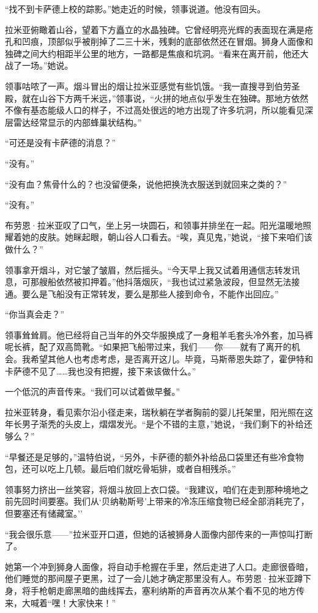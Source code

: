 \documentclass[AutoFakeBold=true]{book}
\begin{document}
``找不到卡萨德上校的踪影。''她走近的时候，领事说道。他没有回头。

拉米亚俯瞰着山谷，望着下方矗立的水晶独碑。它曾经明亮光辉的表面现在满是疮孔和凹痕，顶部似乎被削掉了二三十米，残剩的底部依然还在冒烟。狮身人面像和独碑之间大约相距半公里的地方，一路都是焦痕和坑洞。``看来在离开前，他还大战了一场。''她说。

领事咕哝了一声。烟斗冒出的烟让拉米亚感觉有些饥饿。``我一直搜寻到伯劳圣殿，就在山谷下方两千米远，''领事说，``火拼的地点似乎发生在独碑。那地方依然不像有基态能级人口的样子，不过高处很远的地方出现了许多坑洞，所以能看见深层雷达经常显示的内部蜂巢状结构。''

``可还是没有卡萨德的消息？''

``没有。''

``没有血？焦骨什么的？也没留便条，说他把换洗衣服送到就回来之类的？''

``没有。''

布劳恩·拉米亚叹了口气，坐上另一块圆石，和领事并排坐在一起。阳光温暖地照耀着她的皮肤。她眯起眼，朝山谷人口看去。``唉，真见鬼，''她说，``接下来咱们该做什么？''

领事拿开烟斗，对它皱了皱眉，然后摇头。``今天早上我又试着用通信志转发讯息，可那艘船依然被扣押着。''他抖落烟灰，``我也试过紧急波段，但显然无法接通。要么是飞船没有正常转发，要么是那些人接到命令，不能作出回应。''

``你当真会走？''

领事耸耸肩。他已经将自己当年的外交华服换成了一身粗羊毛套头冷外套，加马裤呢长裤，配了双高筒靴。``如果把飞船带过来，我们——你——就有了离开的机会。我希望其他人也考虑考虑，是否离开这儿。毕竟，马斯蒂恩失踪了，霍伊特和卡萨德不见了……我也没有把握，接下来该做什么。''

一个低沉的声音传来。``我们可以试着做早餐。''

拉米亚转身，看见索尔沿小径走来，瑞秋躺在学者胸前的婴儿托架里，阳光照在这年长男子渐秃的头皮上，熠熠发光。``是个不错的主意，''她说，``我们剩下的补给还够么？''

``早餐还是足够的，''温特伯说，``另外，卡萨德的额外补给品口袋里还有些冷食物包，还可以吃上几顿。最后咱们就吃骨垢猅，或者自相残杀。''

领事努力挤出一丝笑容，将烟斗放回上衣口袋。``我建议，咱们在走到那种境地之前先回时间要塞。我们从`贝纳勒斯号'上带来的冷冻压缩食物已经全部消耗完了，但要塞还有储藏室。''

``我会很乐意——''拉米亚开口道，但她的话被狮身人面像内部传来的一声惊叫打断了。

她第一个冲到狮身人面像，将自动手枪握在手里，然后走进了人口。走廊很昏暗，他们睡觉的那间屋子更黑，过了一会儿她才确定那里没有人。布劳恩·拉米亚蹲下身，将手枪朝走廊黑暗的曲线挥去，塞利纳斯的声音再次从某个看不见的地方传来，大喊着``嘿！大家快来！''
\end{document}
